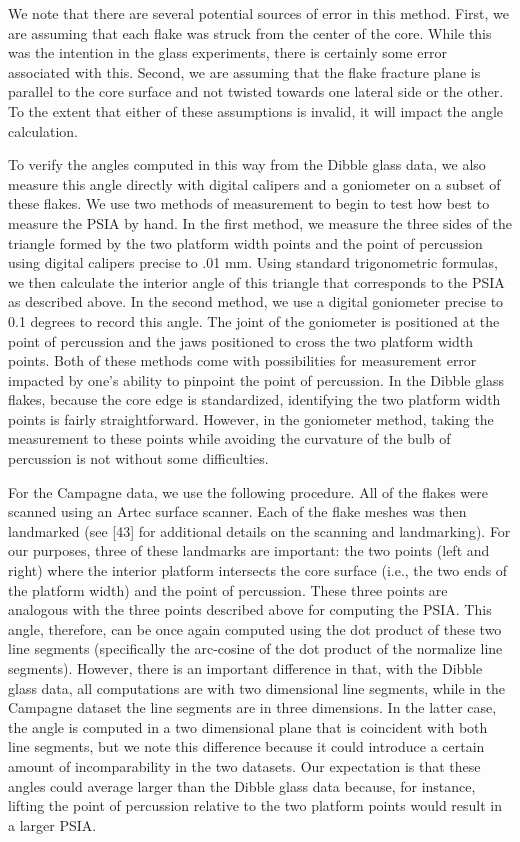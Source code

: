\documentclass[10pt,letterpaper]{article}
\begin{document}
We note that there are several potential sources of error in this
method. First, we are assuming that each flake was struck from the
center of the core. While this was the intention in the glass
experiments, there is certainly some error associated with this. Second,
we are assuming that the flake fracture plane is parallel to the core
surface and not twisted towards one lateral side or the other. To the
extent that either of these assumptions is invalid, it will impact the
angle calculation.

To verify the angles computed in this way from the Dibble glass data, we
also measure this angle directly with digital calipers and a goniometer
on a subset of these flakes. We use two methods of measurement to begin
to test how best to measure the PSIA by hand. In the first method, we
measure the three sides of the triangle formed by the two platform width
points and the point of percussion using digital calipers precise to .01
mm. Using standard trigonometric formulas, we then calculate the
interior angle of this triangle that corresponds to the PSIA as
described above. In the second method, we use a digital goniometer
precise to 0.1 degrees to record this angle. The joint of the goniometer
is positioned at the point of percussion and the jaws positioned to
cross the two platform width points. Both of these methods come with
possibilities for measurement error impacted by one's ability to
pinpoint the point of percussion. In the Dibble glass flakes, because
the core edge is standardized, identifying the two platform width points
is fairly straightforward. However, in the goniometer method, taking the
measurement to these points while avoiding the curvature of the bulb of
percussion is not without some difficulties.

For the Campagne data, we use the following procedure. All of the flakes
were scanned using an Artec surface scanner. Each of the flake meshes
was then landmarked (see {[}43{]} for additional details on the scanning
and landmarking). For our purposes, three of these landmarks are
important: the two points (left and right) where the interior platform
intersects the core surface (i.e., the two ends of the platform width)
and the point of percussion. These three points are analogous with the
three points described above for computing the PSIA. This angle,
therefore, can be once again computed using the dot product of these two
line segments (specifically the arc-cosine of the dot product of the
normalize line segments). However, there is an important difference in
that, with the Dibble glass data, all computations are with two
dimensional line segments, while in the Campagne dataset the line
segments are in three dimensions. In the latter case, the angle is
computed in a two dimensional plane that is coincident with both line
segments, but we note this difference because it could introduce a
certain amount of incomparability in the two datasets. Our expectation
is that these angles could average larger than the Dibble glass data
because, for instance, lifting the point of percussion relative to the
two platform points would result in a larger PSIA.
\end{document}
